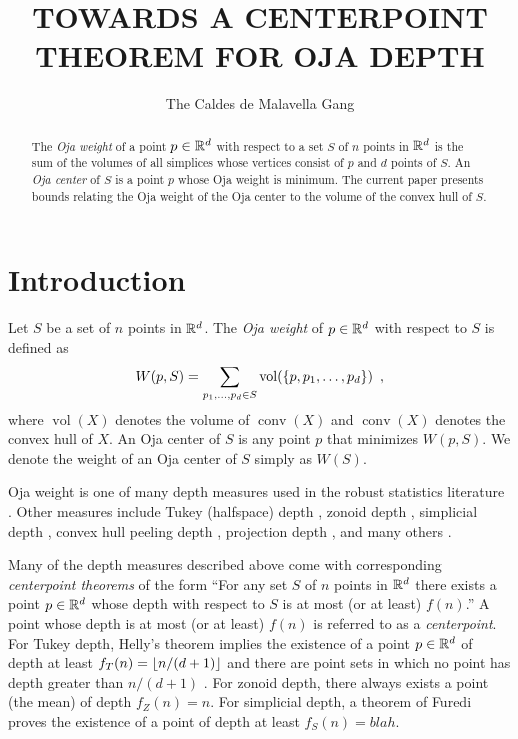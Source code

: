\documentclass[lotsofwhite]{patmorin}
\title{\MakeUppercase{Towards a Centerpoint Theorem for Oja Depth}}
\author{The Caldes de Malavella Gang}
\date{}
\newcommand{\oja}{W}
\DeclareMathOperator{\vol}{vol}
\DeclareMathOperator{\conv}{conv}
\begin{document}
\maketitle

\begin{abstract}
The \emph{Oja weight} of a point $p\in\mathbb{R}^d$ with respect to a set $S$
of $n$ points in $\mathbb{R}^d$ is the sum of the volumes of all simplices
whose vertices consist of $p$ and $d$ points of $S$.  An \emph{Oja
center} of $S$ is a point $p$ whose Oja weight is minimum.
The current paper presents bounds relating the Oja weight of the Oja 
center to the volume of the convex hull of $S$.
\end{abstract}


\section{Introduction}

Let $S$ be a set of $n$ points in $\mathbb{R}^d$.  The \emph{Oja weight} of
$p\in\mathbb{R}^d$ with respect to $S$ is defined as
\begin{equation}
     \oja(p,S) = \sum_{p_1,\ldots,p_d\in S}\vol(\{p,p_1,\ldots,p_d\})
      \enspace , \eqnlabel{oja}
\end{equation}
where $\vol(X)$ denotes the volume of $\conv(X)$ and $\conv(X)$
denotes the convex hull of
$X$.  An Oja center of $S$ is any
point $p$ that minimizes $W(p,S)$.  We denote the weight of an Oja
center of $S$ simply as $W(S)$.

Oja weight is one of many depth measures used in the robust statistics
literature \cite{X,X,X,X}.  Other measures include Tukey (halfspace)
depth \cite{X}, zonoid depth \cite{X}, simplicial depth \cite{X},
convex hull peeling depth \cite{X}, projection depth \cite{X}, and
many others \cite{X}.

Many of the depth measures described above come with corresponding
\emph{centerpoint theorems} of the form ``For any set $S$ of $n$ points
in $\mathbb{R}^d$ there exists a point $p\in\mathbb{R}^d$ whose depth with respect to $S$ is
at most (or at least) $f(n)$.''  A point whose depth is at most (or at
least) $f(n)$ is referred to as a \emph{centerpoint}.  For Tukey
depth, Helly's theorem implies the existence of a point $p\in\mathbb{R}^d$ of
depth at least $f_T(n)=\left\lfloor n/(d+1) \right\rfloor$ and there are point sets in
which no point has depth greater than $n/(d+1)$ \cite{X}.  For zonoid
depth, there always exists a point (the mean) of depth $f_Z(n)=n$.
For simplicial depth, a theorem of Furedi \cite{fXX} proves the
existence of a point of depth at least $f_S(n)=blah$.
\end{document}
